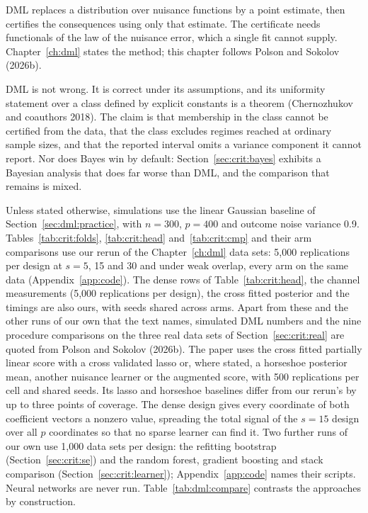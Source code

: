 DML replaces a distribution over nuisance functions by a point estimate, then certifies the consequences using only that estimate. The certificate needs functionals of the law of the nuisance error, which a single fit cannot supply. Chapter~\ref{ch:dml} states the method; this chapter follows Polson and Sokolov (2026b).

DML is not wrong. It is correct under its assumptions, and its uniformity statement over a class defined by explicit constants is a theorem (Chernozhukov and coauthors 2018). The claim is that membership in the class cannot be certified from the data, that the class excludes regimes reached at ordinary sample sizes, and that the reported interval omits a variance component it cannot report. Nor does Bayes win by default: Section~\ref{sec:crit:bayes} exhibits a Bayesian analysis that does far worse than DML, and the comparison that remains is mixed.

Unless stated otherwise, simulations use the linear Gaussian baseline of Section~\ref{sec:dml:practice}, with $n = 300$, $p = 400$ and outcome noise variance 0.9. Tables~\ref{tab:crit:folds}, \ref{tab:crit:head} and~\ref{tab:crit:cmp} and their arm comparisons use our rerun of the Chapter~\ref{ch:dml} data sets: 5,000 replications per design at $s = 5$, 15 and 30 and under weak overlap, every arm on the same data (Appendix~\ref{app:code}). The dense rows of Table~\ref{tab:crit:head}, the channel measurements (5,000 replications per design), the cross fitted posterior and the timings are also ours, with seeds shared across arms. Apart from these and the other runs of our own that the text names, simulated DML numbers and the nine procedure comparisons on the three real data sets of Section~\ref{sec:crit:real} are quoted from Polson and Sokolov (2026b). The paper uses the cross fitted partially linear score with a cross validated lasso or, where stated, a horseshoe posterior mean, another nuisance learner or the augmented score, with 500 replications per cell and shared seeds. Its lasso and horseshoe baselines differ from our rerun's by up to three points of coverage. The dense design gives every coordinate of both coefficient vectors a nonzero value, spreading the total signal of the $s = 15$ design over all $p$ coordinates so that no sparse learner can find it. Two further runs of our own use 1,000 data sets per design: the refitting bootstrap (Section~\ref{sec:crit:se}) and the random forest, gradient boosting and stack comparison (Section~\ref{sec:crit:learner}); Appendix~\ref{app:code} names their scripts. Neural networks are never run. Table~\ref{tab:dml:compare} contrasts the approaches by construction.

